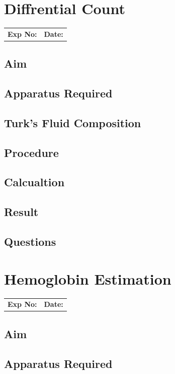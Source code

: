 \documentclass[a4paper,12pt]{book}
\begin{document}
\chapter*{\centering Diffrential Count}
		\begin{tabular}{p{5in} p{1in}}
			\textbf{Exp No:}  & \textbf{Date:}\\
		\end{tabular}

	\section*{Aim}
	\section*{Apparatus Required}
	\section*{Turk's Fluid Composition}
	\section*{Procedure}
	\section*{Calcualtion}
	\section*{Result}
	\section*{Questions}

\chapter*{\centering Hemoglobin Estimation}
		\begin{tabular}{p{5in} p{1in}}
			\textbf{Exp No:}  & \textbf{Date:}\\
		\end{tabular}

	\section*{Aim}
	\section*{Apparatus Required}
\end{document}
